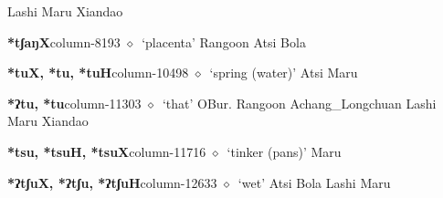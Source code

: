 \hspace{1ex}
         Lashi 
\hspace{1ex}
         Maru 
\hspace{1ex}
         Xiandao 
  \item {\footnotesize \textbf{*tʃaŋX}}{\tiny column-8193}
         $\diamond$~`placenta'
         Rangoon 
\hspace{1ex}
         Atsi 
\hspace{1ex}
         Bola 
  \item {\footnotesize \textbf{*tuX, *tu, *tuH}}{\tiny column-10498}
         $\diamond$~`spring (water)'
         Atsi 
\hspace{1ex}
         Maru 
  \item {\footnotesize \textbf{*ʔtu, *tu}}{\tiny column-11303}
         $\diamond$~`that'
         OBur. 
\hspace{1ex}
         Rangoon 
\hspace{1ex}
         Achang\_Longchuan 
\hspace{1ex}
         Lashi 
\hspace{1ex}
         Maru 
\hspace{1ex}
         Xiandao 
  \item {\footnotesize \textbf{*tsu, *tsuH, *tsuX}}{\tiny column-11716}
         $\diamond$~`tinker (pans)'
         Maru 
  \item {\footnotesize \textbf{*ʔtʃuX, *ʔtʃu, *ʔtʃuH}}{\tiny column-12633}
         $\diamond$~`wet'
         Atsi 
\hspace{1ex}
         Bola 
\hspace{1ex}
         Lashi 
\hspace{1ex}
         Maru 
\hspace{1ex}
